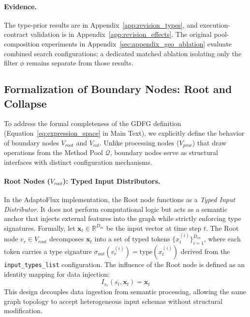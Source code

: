 \paragraph{Evidence.}
The type-prior results are in Appendix~\ref{app:revision_types}, and execution-contract validation is in Appendix~\ref{app:revision_effects}. The original pool-composition experiments in Appendix~\ref{sec:appendix_geo_ablation} evaluate combined search configurations; a dedicated matched ablation isolating only the filter $\phi$ remains separate from those results.

\subsection{Formalization of Boundary Nodes: Root and Collapse}
\label{sec:supp-boundary-nodes}

To address the formal completeness of the GDFG definition (Equation~\ref{eq:expression_space} in Main Text), we explicitly define the behavior of boundary nodes $V_{root}$ and $V_{col}$. Unlike processing nodes ($V_{proc}$) that draw operations from the Method Pool $\mathcal{Q}$, boundary nodes serve as structural interfaces with distinct configuration mechanisms.

\paragraph{Root Nodes ($V_{root}$): Typed Input Distributors.}
In the AdaptoFlux implementation, the Root node functions as a \textit{Typed Input Distributor}. It does not perform computational logic but acts as a semantic anchor that injects external features into the graph while strictly enforcing type signatures. 
Formally, let $\mathbf{x}_t \in \mathbb{R}^{D_{in}}$ be the input vector at time step $t$. The Root node $v_r \in V_{root}$ decomposes $\mathbf{x}_t$ into a set of typed tokens $\{x_{t}^{(i)}\}_{i=1}^{D_{in}}$, where each token carries a type signature $\sigma_{out}(v_r^{(i)}) = \text{type}(x_{t}^{(i)})$ derived from the \texttt{input\_types\_list} configuration. 
The influence of the Root node is defined as an identity mapping for data injection:
\begin{equation}
    I_{v_r}(s_t, \mathbf{x}_t) = \mathbf{x}_t
\end{equation}
This design decouples data ingestion from semantic processing, allowing the same graph topology to accept heterogeneous input schemas without structural modification.

